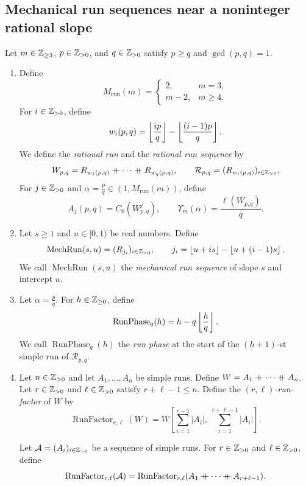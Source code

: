 \subsection{Mechanical run sequences near a noninteger rational slope}
\begin{definition}\label{def:mechanical-paths}
Let $m\in\mathbb Z_{\ge3}$, $p\in\mathbb Z_{>0}$, and $q\in\mathbb Z_{>0}$ satisfy $p\ge q$ and $\gcd(p,q)=1$.
\begin{enumerate}[font=\itshape]
\item\label{d:rational-period} Define
\[
 M_{\mathrm{run}}(m)=\begin{cases}2,&m=3,\\m-2,&m\ge4.\end{cases}
\]
For $i\in\mathbb Z_{>0}$, define
\[
 w_i(p,q)=\left\lfloor\frac{ip}{q}\right\rfloor-\left\lfloor\frac{(i-1)p}{q}\right\rfloor.
\]
We define the \textit{rational run} and the \textit{rational run sequence} by
\[
 W_{p,q}=R_{w_1(p,q)}\mathbin{+\mkern-10mu+}\cdots\mathbin{+\mkern-10mu+} R_{w_q(p,q)},\qquad
 \mathcal R_{p,q}=(R_{w_i(p,q)})_{i\in\mathbb Z_{>0}}.
\]
For $j\in\mathbb Z_{>0}$ and $\alpha=\frac pq\in(1,M_{\mathrm{run}}(m))$, define
\begin{equation}\label{eq:rational-period}
 A_j(p,q)=C_0(W_{p,q}^j),\qquad \Upsilon_m(\alpha)=\frac{\ell(W_{p,q})}q.
\end{equation}
\item\label{d:mechanical-sequence} Let $s\ge1$ and $u\in[0,1)$ be real numbers. Define
\[
 \operatorname{MechRun}(s,u)=(R_{j_i})_{i\in\mathbb Z_{>0}},\qquad
 j_i=\left\lfloor u+is\right\rfloor-\left\lfloor u+(i-1)s\right\rfloor.
\]
We call $\operatorname{MechRun}(s,u)$ the
\textit{mechanical run sequence} of slope $s$ and intercept $u$.
\item Let $\alpha=\frac pq$.
For $h\in\mathbb Z_{\ge0}$, define
\[
 \operatorname{RunPhase}_q(h)=h-q\left\lfloor\frac hq\right\rfloor.
\]
We call $\operatorname{RunPhase}_q(h)$ the \textit{run phase} at the start of the $(h+1)$-st simple run of $\mathcal R_{p,q}$.
\item Let $n\in\mathbb Z_{>0}$ and let $A_1,\ldots,A_n$ be simple runs.
Define $W=A_1\mathbin{+\mkern-10mu+} \cdots\mathbin{+\mkern-10mu+} A_n$.
Let $r\in\mathbb Z_{>0}$ and $\ell\in\mathbb Z_{>0}$ satisfy $r+\ell-1\le n$.
Define the \textit{$(r,\ell)$-run-factor} of $W$ by
\[
 \operatorname{RunFactor}_{r,\ell}(W)
 =W\left[\sum_{i=1}^{r-1}|A_i|,\ \sum_{i=1}^{r+\ell-1}|A_i|\right].
\]

Let $\mathcal A=(A_i)_{i\in\mathbb Z_{>0}}$ be a sequence of simple runs.
For $r\in\mathbb Z_{>0}$ and $\ell\in\mathbb Z_{>0}$, define
\[
 \operatorname{RunFactor}_{r,\ell}(\mathcal A)
 =\operatorname{RunFactor}_{r,\ell}(A_1\mathbin{+\mkern-10mu+} \cdots\mathbin{+\mkern-10mu+} A_{r+\ell-1}).
\]
\end{enumerate}
\end{definition}

